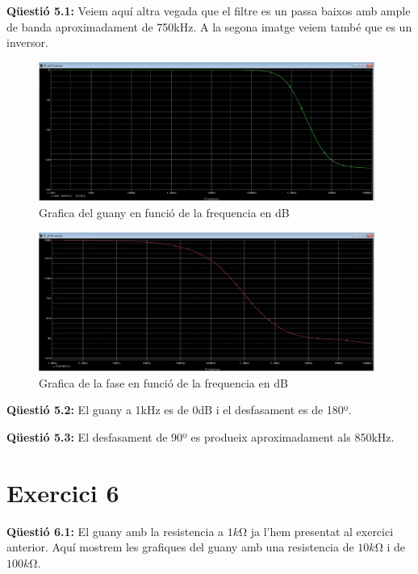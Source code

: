 \documentclass[12pt, a4papre]{article}
\begin{document}
	\textbf{Qüestió 5.1:} Veiem aquí altra vegada que el filtre es un passa baixos amb ample de banda aproximadament de 750kHz.  A la segona imatge veiem també que es un inversor.
	
	\begin{figure}[H]
		\begin{center}
		\includegraphics[width=110mm]{5_1_1_db.PNG}
		\caption{Grafica del guany en funció de la frequencia en dB}
		\end{center}
	\end{figure}
	
	\begin{figure}[H]
		\begin{center}
		\includegraphics[width=110mm]{5_1_2_gran.PNG}
		\caption{Grafica de la fase en funció de la frequencia en dB}
		\end{center}
	\end{figure}
	
	\textbf{Qüestió 5.2:} El guany a 1kHz es de 0dB i el desfasament es de 180º.
	
	\textbf{Qüestió 5.3:} El desfasament de 90º es produeix aproximadament als 850kHz.
	
	\section{Exercici 6} 
	
	\textbf{Qüestió 6.1:} El guany amb la resistencia a $1k\si{\ohm}$ ja l'hem presentat al exercici anterior. Aquí mostrem les grafiques del guany amb una resistencia de $10k\si{\ohm}$ i de $100k\si{\ohm}$.
	
\end{document}
